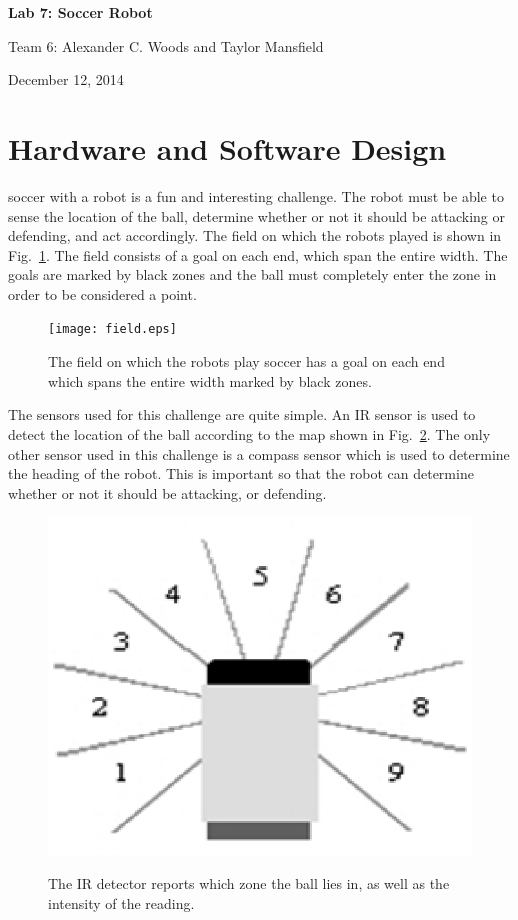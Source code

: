 \documentclass[journal]{../IEEEtran}
\begin{document}
\begin{titlepage}
    \vspace*{\fill}
    \begin{center}
      {\LARGE \bf Lab 7: Soccer Robot}

      {Team 6: Alexander  C. Woods and Taylor Mansfield}

      December 12, 2014
    \end{center}
    \vspace*{\fill}
  \end{titlepage}


\section{Hardware and Software Design}\label{S.design}
 soccer with a robot is a fun and interesting challenge. The robot must be able to sense the location of the ball, determine whether or not it should be attacking or defending, and act accordingly. The field on which the robots played is shown in Fig.~\ref{F.field}. The field consists of a goal on each end, which span the entire width. The goals are marked by black zones and the ball must completely enter the zone in order to be considered a point.

\begin{figure}[ht]
\centering
\texttt{[image: field.eps]}\\
\caption{The field on which the robots play soccer has a goal on each end which spans the entire width marked by black zones.}
\label{F.field}
\end{figure}

The sensors used for this challenge are quite simple. An IR sensor is used to detect the location of the ball according to the map shown in Fig.~\ref{F.ir_map}. The only other sensor used in this challenge is a compass sensor which is used to determine the heading of the robot. This is important so that the robot can determine whether or not it should be attacking, or defending.

\begin{figure}[ht]
\centering
\includegraphics[width=0.6\columnwidth]{ir_map.eps}\\
\caption{The IR detector reports which zone the ball lies in, as well as the intensity of the reading.}
\label{F.ir_map}
\end{figure}
\end{document}

